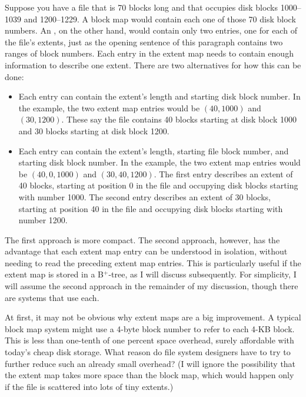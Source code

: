 Suppose you have a file that is 70 blocks long and that occupies
disk blocks 1000--1039 and 1200--1229.  A
block map would contain each one of those 70 disk block numbers.  An
, on the other hand, would contain only two
entries, one for each of the file's extents, just as the opening
sentence of this paragraph contains two
ranges of block numbers.  Each entry in the extent
map needs to contain enough information to describe one extent.  There
are two alternatives for how this can be done:
\begin{itemize}
\item
Each entry can contain the extent's length and starting disk block
number.  In the example, the two extent map entries would be $(40,
1000)$ and $(30, 1200)$.  These say the file contains 40 blocks
starting at disk block 1000 and 30 blocks starting at disk block
1200.
\item
Each entry can contain the extent's length, starting file block
number, and starting disk block number.  In the example, the two
extent map entries would be $(40, 0, 1000)$ and $(30, 40, 1200)$.  The
first entry describes an extent of 40 blocks, starting at position 0 in the
file and occupying disk blocks starting with number 1000.  The second entry
describes an extent of 30 blocks, starting
at position 40 in the file and occupying disk blocks starting with number 1200.
\end{itemize}
The first approach is more compact.  The second approach, however, has the
advantage that each extent map entry can be understood in isolation,
without needing to read the preceding extent map entries.  This is
particularly useful if the extent map is stored in a B${}^+$-tree, as I
will discuss subsequently. For simplicity, I will assume the second approach
in the remainder of my discussion, though there are systems that use
each.

At first, it may not be obvious why extent maps are a big improvement.
A typical block map system might use a 4-byte block number to refer
to each 4-KB block.  This is less than one-tenth of one percent space
overhead, surely affordable with today's cheap disk storage.  What
reason do file system designers have to try to further reduce such an already small
overhead?  (I will ignore the possibility that the extent map takes
more space than the block map, which would happen only if the file is
scattered into lots of tiny extents.)

